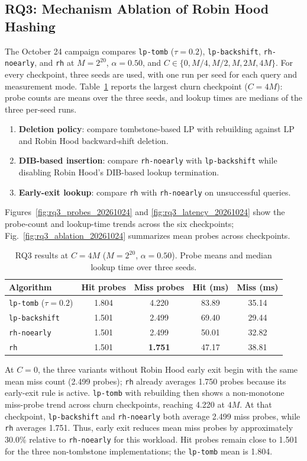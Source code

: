 \documentclass[conference]{IEEEtran}
\begin{document}
\subsection{RQ3: Mechanism Ablation of Robin Hood Hashing}
The October 24 campaign compares \texttt{lp-tomb} ($\tau=0.2$),
\texttt{lp-backshift}, \texttt{rh-noearly}, and \texttt{rh} at
$M=2^{20}$, $\alpha=0.50$, and
$C\in\{0,M/4,M/2,M,2M,4M\}$. For every checkpoint, three seeds are used,
with one run per seed for each query and measurement mode. Table~\ref{tab:rq3_results}
reports the largest churn checkpoint ($C=4M$): probe counts are means over
the three seeds, and lookup times are medians of the three per-seed runs.
\begin{enumerate}
    \item \textbf{Deletion policy}: compare tombstone-based LP with rebuilding against LP and Robin Hood backward-shift deletion.
    \item \textbf{DIB-based insertion}: compare \texttt{rh-noearly} with \texttt{lp-backshift} while disabling Robin Hood's DIB-based lookup termination.
    \item \textbf{Early-exit lookup}: compare \texttt{rh} with \texttt{rh-noearly} on unsuccessful queries.
\end{enumerate}
Figures~\ref{fig:rq3_probes_20261024} and \ref{fig:rq3_latency_20261024} show
the probe-count and lookup-time trends across the six checkpoints;
Fig.~\ref{fig:rq3_ablation_20261024} summarizes mean probes across checkpoints.

\begin{table}[htbp]
\caption{RQ3 results at $C=4M$ ($M=2^{20}$, $\alpha=0.50$). Probe means and median lookup time over three seeds.}
\label{tab:rq3_results}
\centering
\begin{tabular}{|l|c|c|c|c|}
\hline
\textbf{Algorithm} & \textbf{Hit probes} & \textbf{Miss probes} & \textbf{Hit (ms)} & \textbf{Miss (ms)} \\
\hline
\texttt{lp-tomb} ($\tau=0.2$) & 1.804 & 4.220 & 83.89 & 35.14 \\
\texttt{lp-backshift} & 1.501 & 2.499 & 69.40 & 29.44 \\
\texttt{rh-noearly} & 1.501 & 2.499 & 50.01 & 32.82 \\
\texttt{rh} & 1.501 & \textbf{1.751} & 47.17 & 38.81 \\
\hline
\end{tabular}
\end{table}

At $C=0$, the three variants without Robin Hood early exit begin with the same
mean miss count (2.499 probes); \texttt{rh} already averages 1.750 probes
because its early-exit rule is active. \texttt{lp-tomb} with rebuilding then
shows a non-monotone miss-probe trend across churn checkpoints, reaching 4.220
at $4M$. At that
checkpoint, \texttt{lp-backshift} and \texttt{rh-noearly} both average 2.499
miss probes, while \texttt{rh} averages 1.751. Thus, early exit reduces mean
miss probes by approximately 30.0\% relative to \texttt{rh-noearly} for this
workload. Hit probes remain close to 1.501 for the three non-tombstone
implementations; the \texttt{lp-tomb} mean is 1.804.
\end{document}
